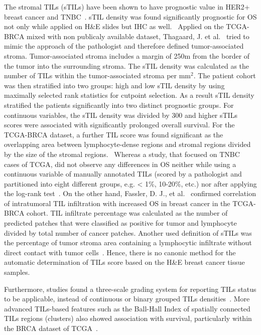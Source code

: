 The stromal TILs (sTILs) have been shown to have prognostic value in HER2+ breast cancer and TNBC~\cite{kos2020pitfalls}. 
sTIL density was found significantly prognostic for OS not only while applied on H\&E slides but IHC as well.~\cite{kapil2021breast}
Applied on the TCGA-BRCA mixed with non publicaly available dataset, Thagaard, J. et al.~\cite{thagaard2021automated} tried to mimic the approach of the pathologist and therefore defined tumor-associated stroma. Tumor-associated stroma includes a margin of 250\textmu m from the border of the tumor into the surrounding stroma. The sTIL density was calculated as the number of TILs within the tumor-associated stroma per mm$^2$. The patient cohort was then stratified into two groups: high and low sTIL density by using maximally selected rank statistics for cutpoint selection. As a result sTIL density stratified the patients significantly into two distinct prognostic groups.  For continuous variables, the sTIL density was divided by 300 and higher sTILs scores were associated with significantly prolonged overall survival. For the TCGA-BRCA dataset, a further TIL score was found significant as the overlapping area between lymphocyte-dense regions and stromal regions divided by the size of the stromal regions.~\cite{sun2021computational}  Whereas a study, that focused on TNBC cases of TCGA, did not observe any differences in OS neither while using a continuous variable of manually annotated TILs (scored by a pathologist and partitioned into eight different groups, e.g. < 1\%, 10-20\%, etc.) nor after applying the log-rank test~\cite{craven2021cibersort}.
On the other hand, Fassler, D. J., et al.~\cite{fassler2022spatial} confirmed correlation of intratumoral TIL infiltration with increased OS in breast cancer in the TCGA-BRCA cohort. TIL infiltrate percentage was calculated as the number of predicted patches that were classified as positive for tumor and lymphocyte divided by total number of cancer patches.
Another used definition of sTILs was the percentage of tumor stroma area containing a lymphocytic infiltrate without direct contact with tumor cells~\cite{meng2018distribution}.
Hence, there is no canonic method for the automatic determination of TILs score based on the H\&E breast cancer tissue samples.

Furthermore, studies found a three-scale grading system for reporting TILs status to be applicable, instead of continuous or binary grouped TILs densities~\cite{kotoula2016tumors}. More advanced TILs-based features such as the Ball-Hall Index of spatially connected TILs regions (clusters) also showed association with survival, particularly within the BRCA dataset of TCGA~\cite{saltz2018spatial}. 